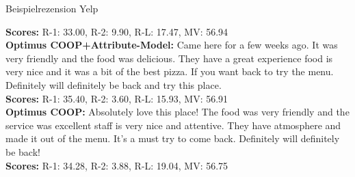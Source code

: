 \begin{frame}{Beispielrezension Yelp}
\begin{Rezension}[!h]
{{        \textbf{Scores:} R-1: 33.00, R-2: 9.90, R-L: 17.47, MV: 56.94 \\ 

        \textbf{Optimus COOP+Attribute-Model:} Came here for \textcolor{HighlightColor}{a} few weeks ago\textcolor{HighlightColor}{.} It was very friendly \textcolor{HighlightColor}{and} \textcolor{HighlightColor}{the} \textcolor{HighlightColor}{food} was delicious\textcolor{HighlightColor}{.} They \textcolor{HighlightColor}{have} \textcolor{HighlightColor}{a} great experience\underline{\ccolorbox[BackgroundColor]{\textcolor{HighlightColor}{. The}}} \textcolor{HighlightColor}{food} \textcolor{HighlightColor}{is} very \textcolor{HighlightColor}{nice} \textcolor{HighlightColor}{and} it was \textcolor{HighlightColor}{a} bit \textcolor{HighlightColor}{of} \textcolor{HighlightColor}{the} best pizza\textcolor{HighlightColor}{.} If you want \ccolorbox[BackgroundColor]{ \textcolor{HighlightColor}{to go}} back \textcolor{HighlightColor}{to} try \textcolor{HighlightColor}{the} menu\textcolor{HighlightColor}{.} Definitely will definitely \textcolor{HighlightColor}{be} back \textcolor{HighlightColor}{and} try this \textcolor{HighlightColor}{place}\textcolor{HighlightColor}{.}         \\ 
        \textbf{Scores:} R-1: 35.40, R-2: 3.60, R-L: 15.93, MV: 56.91 \\ 
        \textbf{Optimus COOP:} Absolutely love this \textcolor{HighlightColor}{place}! \textcolor{HighlightColor}{The} \textcolor{HighlightColor}{food} was very friendly \textcolor{HighlightColor}{and} \textcolor{HighlightColor}{the} service was excellent\ccolorbox[BackgroundColor]{\textcolor{HighlightColor}{. The}} staff \textcolor{HighlightColor}{is} very \textcolor{HighlightColor}{nice} \textcolor{HighlightColor}{and} attentive\textcolor{HighlightColor}{.} They \textcolor{HighlightColor}{have} \underline{\ccolorbox[BackgroundColor]{ \textcolor{HighlightColor}{a nice}}} \textcolor{HighlightColor}{atmosphere} \textcolor{HighlightColor}{and} made it out \textcolor{HighlightColor}{of} \textcolor{HighlightColor}{the} menu\textcolor{HighlightColor}{.} It's \textcolor{HighlightColor}{a} must try \textcolor{HighlightColor}{to} come back\textcolor{HighlightColor}{.} Definitely will definitely \textcolor{HighlightColor}{be} back!         \\ 
        \textbf{Scores:} R-1: 34.28, R-2: 3.88, R-L: 19.04, MV: 56.75  
        }
    }
\end{Rezension}
\end{frame}




